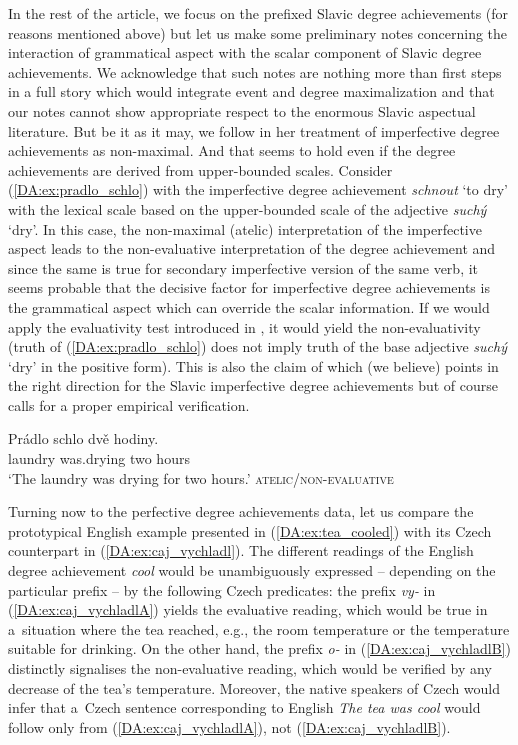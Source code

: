 \documentclass[output=paper]{langscibook}
\begin{document}
In the rest of the article, we focus on the prefixed Slavic degree achievements (for reasons mentioned above) but let us make some preliminary notes concerning the interaction of grammatical aspect with the scalar component of Slavic degree achievements. We acknowledge that such notes are nothing more than first steps in a full story which would integrate event and degree maximalization and that our notes cannot show appropriate respect to the enormous Slavic aspectual literature. But be it as it may, we follow \citet{Filip2008} in her treatment of imperfective degree achievements as non-maximal. And that seems to hold even if the degree achievements are derived from upper-bounded scales. Consider (\ref{DA:ex:pradlo_schlo}) with the imperfective degree achievement \textit{schnout} `to dry' with the lexical scale based on the upper-bounded scale of the adjective \textit{suchý} `dry'. In this case, the non-maximal (atelic) interpretation of the imperfective aspect leads to the non-evaluative interpretation of the degree achievement and since the same is true for secondary imperfective version of the same verb, it seems probable that the decisive factor for imperfective degree achievements is the grammatical aspect which can override the scalar information. If we would apply the evaluativity test introduced in , it would yield the non-evaluativity (truth of (\ref{DA:ex:pradlo_schlo}) does not imply truth of the base adjective \textit{suchý} `dry' in the positive form). This is also the claim of \citet{Filip2008} which (we believe) points in the right direction for the Slavic imperfective degree achievements but of course calls for a proper empirical verification.

\ea\label{DA:ex:pradlo_schlo} 
\gll Prádlo schlo dvě hodiny. \\ 
laundry was.drying two hours \\
\glt ‘The laundry was drying for two hours.’ \hfill \textsc{atelic/non-evaluative}
\z 

\noindent Turning now to the perfective degree achievements data, let us compare the prototypical English example presented in (\ref{DA:ex:tea_cooled}) with its Czech counterpart in (\ref{DA:ex:caj_vychladl}). The different readings of the English degree achievement \textit{cool} would be unambiguously expressed -- depending on the particular prefix -- by the following Czech predicates: the prefix \textit{vy-} in (\ref{DA:ex:caj_vychladlA}) yields the evaluative reading, which would be true in a~situation where the tea reached, e.g., the room temperature or the temperature suitable for drinking. On the other hand, the prefix \textit{o-} in (\ref{DA:ex:caj_vychladlB}) distinctly signalises the non-evaluative reading, which would be verified by any decrease of the tea's temperature. Moreover, the native speakers of Czech would infer that a~Czech sentence corresponding to English \textit{The tea was cool} would follow only from (\ref{DA:ex:caj_vychladlA}), not (\ref{DA:ex:caj_vychladlB}).
\end{document}
